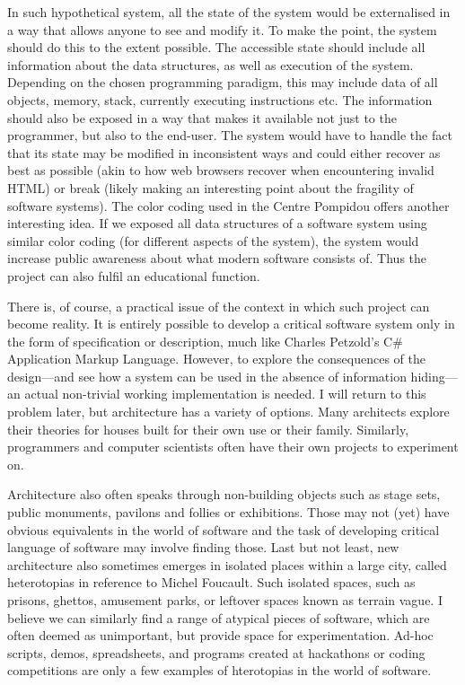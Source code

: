 In such hypothetical system, all the state of the system
would be externalised in a way that allows anyone to see and modify it. To make the point,
the system should do this to the extent possible. The accessible state should include all
information about the data structures, as well as execution of the system. Depending on the
chosen programming paradigm, this may include data of all objects, memory, stack, currently
executing instructions etc. The information should also be exposed in a way that makes it
available not just to the programmer, but also to the end-user. The system would have to handle the fact that
its state may be modified in inconsistent ways and could either recover as best as possible
(akin to how web browsers recover when encountering invalid HTML) or break (likely making an
interesting point about the fragility of software systems).
The color coding used in the Centre Pompidou offers another interesting idea. If we exposed
all data structures of a software system using similar color coding (for different aspects
of the system), the system would increase public awareness about what modern software consists
of. Thus the project can also fulfil an educational function.

There is, of course, a practical issue of the context in which such project can become
reality. It is entirely possible to develop a critical software system only in the form of
specification or description, much like Charles Petzold's C\# Application Markup Language.
However, to explore the consequences of the design---and see how a system can be used in
the absence of information hiding---an actual non-trivial working implementation is needed.
I will return to this problem later, but architecture has a variety of options. Many
architects explore their theories for houses built for their own use or their
family. Similarly, programmers and computer
scientists often have their own projects to experiment on.

Architecture also often speaks through
non-building objects such as stage sets, public monuments, pavilons and follies or exhibitions.
Those may not (yet) have obvious equivalents in the world of software and the task of developing
critical language of software may involve finding those. Last but not least, new architecture
also sometimes emerges in isolated places within a large city, called heterotopias in reference
to Michel Foucault. Such isolated spaces, such as prisons, ghettos,
amusement parks, or leftover spaces known as terrain vague.
I believe we can similarly find a range of atypical pieces of software, which are often deemed
as unimportant, but provide space for experimentation. Ad-hoc scripts, demos, spreadsheets,
and programs created at hackathons or coding competitions are only a few examples of hterotopias
in the world of software.

